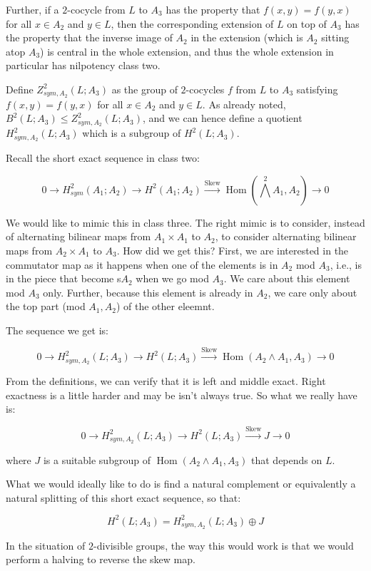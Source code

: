 \documentclass[10pt]{amsart}
\newcommand{\Skew}{\operatorname{Skew}}
\begin{document}
Further, if a $2$-cocycle from $L$ to $A_3$ has the property that
$f(x,y) = f(y,x)$ for all $x \in A_2$ and $y \in L$, then the
corresponding extension of $L$ on top of $A_3$ has the property that
the inverse image of $A_2$ in the extension (which is $A_2$ sitting
atop $A_3$) is central in the whole extension, and thus the whole
extension in particular has nilpotency class two.

Define $Z^2_{sym,A_2}(L;A_3)$ as the group of $2$-cocycles $f$ from
$L$ to $A_3$ satisfying $f(x,y) = f(y,x)$ for all $x \in A_2$ and $y
\in L$. As already noted, $B^2(L;A_3) \le Z^2_{sym,A_2}(L;A_3)$, and
we can hence define a quotient $H^2_{sym,A_2}(L;A_3)$ which is a
subgroup of $H^2(L;A_3)$.

Recall the short exact sequence in class two:

$$0 \to H^2_{sym}(A_1;A_2) \to H^2(A_1;A_2) \stackrel{\Skew}{\to} \operatorname{Hom}(\bigwedge^2A_1,A_2) \to 0$$

We would like to mimic this in class three. The right mimic is to
consider, instead of alternating bilinear maps from $A_1 \times A_1$
to $A_2$, to consider alternating bilinear maps from $A_2 \times A_1$
to $A_3$. How did we get this? First, we are interested in the
commutator map as it happens when one of the elements is in $A_2$ mod
$A_3$, i.e., is in the piece that become s$A_2$ when we go mod
$A_3$. We care about this element mod $A_3$ only. Further, because
this element is already in $A_2$, we care only about the top part (mod
$A_1,A_2$) of the other eleemnt. 

The sequence we get is:

$$0 \to H^2_{sym,A_2}(L;A_3) \to H^2(L;A_3) \stackrel{\Skew}{\to} \operatorname{Hom}(A_2 \wedge A_1,A_3) \to 0$$

From the definitions, we can verify that it is left and middle
exact. Right exactness is a little harder and may be isn't always
true. So what we really have is:

$$0 \to H^2_{sym,A_2}(L;A_3) \to H^2(L;A_3) \stackrel{\Skew}{\to} J \to 0$$

where $J$ is a suitable subgroup of $\operatorname{Hom}(A_2 \wedge
A_1,A_3)$ that depends on $L$.

What we would ideally like to do is find a natural complement or
equivalently a natural splitting of this short exact sequence, so
that:

$$H^2(L;A_3) = H^2_{sym,A_2}(L;A_3) \oplus J$$

In the situation of $2$-divisible groups, the way this would work is
that we would perform a halving to reverse the skew map.
\end{document}
